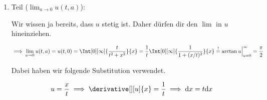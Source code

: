 \begin{solution}
\begin{enumerate}[label = \arabic*.]
    \item Teil ($\lim_{a \to 0} u(t, a)$):
    
    Wir wissen ja bereits, dass $u$ stetig ist.
    Daher dürfen dir den $\lim$ in $u$ hineinziehen.

    \begin{align*}
        \implies
        \lim_{a \to 0} u(t, a)
        =
        u(t, 0)
        =
        \Int[0][\infty]
        {
            \frac{t}{t^2 + x^2}
        }{x}
        =
        \frac{1}{t}
        \Int[0][\infty]
        {
            \frac{1}{1 + (x / t)^2}
        }{x}
        \stackrel{!}{=}
        \arctan u \Big |_{u=0}^\infty
        =
        \frac{\pi}{2}
    \end{align*}

    Dabei haben wir folgende Substitution verwendet.

    \begin{align*}
        u = \frac{x}{t}
        \implies
        \derivative[][u]{x} = \frac{1}{t}
        \implies
        \mathrm{d}x = t \mathrm{d}x
    \end{align*}

\end{enumerate}

\end{solution}


